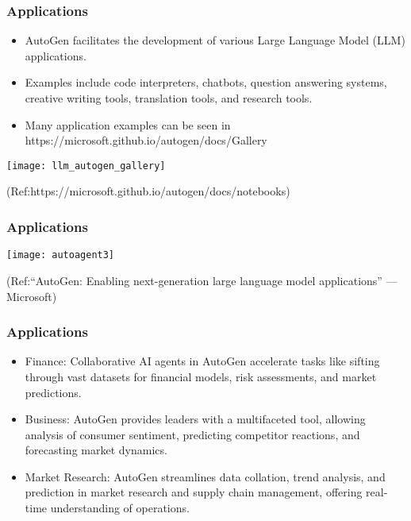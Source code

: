 \begin{frame}[fragile]\frametitle{Applications}
  \begin{itemize}
    \item AutoGen facilitates the development of various Large Language Model (LLM) applications.
    \item Examples include code interpreters, chatbots, question answering systems, creative writing tools, translation tools, and research tools.
	\item Many application examples can be seen in https://microsoft.github.io/autogen/docs/Gallery
  \end{itemize}
  
	\begin{center}
	\texttt{[image: llm\_autogen\_gallery]}
	\end{center}
	
{\tiny (Ref:https://microsoft.github.io/autogen/docs/notebooks)}
  
  
\end{frame}

\begin{frame}[fragile]\frametitle{Applications}
	
	\begin{center}
	\texttt{[image: autoagent3]}
	\end{center}
	
{\tiny (Ref:“AutoGen: Enabling next-generation large language model applications” — Microsoft)}
\end{frame}

\begin{frame}[fragile]\frametitle{Applications}
  \begin{itemize}
    \item Finance: Collaborative AI agents in AutoGen accelerate tasks like sifting through vast datasets for financial models, risk assessments, and market predictions.
    \item Business: AutoGen provides leaders with a multifaceted tool, allowing analysis of consumer sentiment, predicting competitor reactions, and forecasting market dynamics.
    \item Market Research: AutoGen streamlines data collation, trend analysis, and prediction in market research and supply chain management, offering real-time understanding of operations.
  \end{itemize}
\end{frame}

